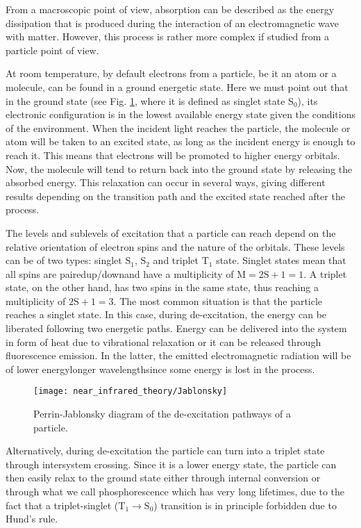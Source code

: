 From a macroscopic point of view, absorption can be described as the energy dissipation that is produced during the interaction of an electromagnetic wave with matter. However, this process is rather more complex if studied from a particle point of view.

At room temperature, by default electrons from a particle, be it an atom or a molecule, can be found in a ground energetic state. Here we must point out that in the ground state (see Fig. \ref{fig:theory_jablonsky}, where it is defined as singlet state $\text{S}_0$), its electronic configuration is in the lowest available energy state given the conditions of the environment. When the incident light reaches the particle, the molecule or atom will be taken to an excited state, as long as the incident energy is enough to reach it. This means that electrons will be promoted to higher energy orbitals. Now, the molecule will tend to return back into the ground state by releasing the absorbed energy. This relaxation can occur in several ways, giving different results depending on the transition path and the excited state reached after the process.

The levels and sublevels of excitation that a particle can reach depend on the relative orientation of electron spins and the nature of the orbitals. These levels can be of two types: singlet $\text{S}_1$, $\text{S}_2$ and triplet $\text{T}_1$ state. Singlet states mean that all spins are paired\textemdash up/down\textemdash and have a multiplicity of $\text{M}=2\text{S}+1=1$. A triplet state, on the other hand, has two spins in the same state, thus reaching a multiplicity of $2\text{S}+1=3$. The most common situation is that the particle reaches a singlet state. In this case, during de-excitation, the energy can be liberated following two energetic paths. Energy can be delivered into the system in form of heat due to vibrational relaxation or it can be released through fluorescence emission. In the latter, the emitted electromagnetic radiation will be of lower energy\textemdash longer wavelength\textemdash since some energy is lost in the process. 

\begin{figure}[]
\centering
\texttt{[image: near\_infrared\_theory/Jablonsky]}
\caption{Perrin-Jablonsky diagram of the de-excitation pathways of a particle.}
\label{fig:theory_jablonsky}       
\end{figure}

Alternatively, during de-excitation the particle can turn into a triplet state through intersystem crossing. Since it is a lower energy state, the particle can then easily relax to the ground state either through internal conversion or through what we call phosphorescence which has very long lifetimes, due to the fact that a triplet-singlet ($\text{T}_1\rightarrow \text{S}_0$) transition is in principle forbidden due to Hund's rule. 

